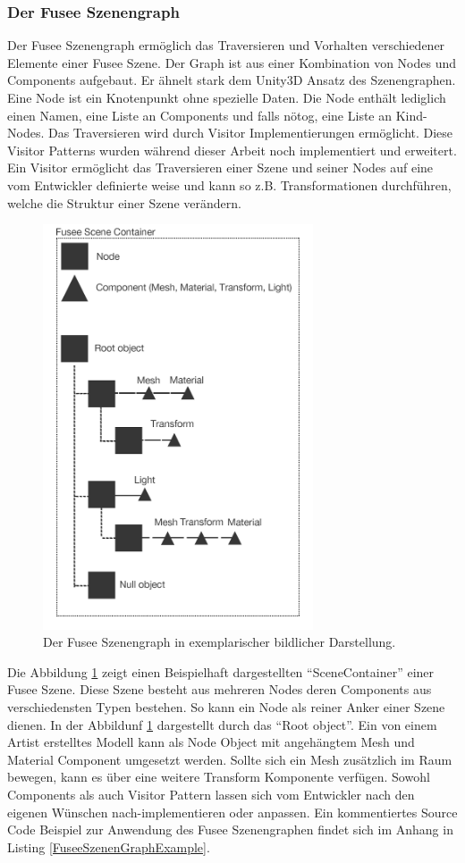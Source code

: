 \documentclass[pagesize, paper=a4, fontsize=12pt, titlepage=true, headings=small, headnosepline, abstractoff, liststotoc, nochapterprefix, plainheadsepline, twoside]{scrreprt}
\begin{document}
\subsubsection{Der Fusee Szenengraph}
Der Fusee Szenengraph ermöglich das Traversieren und Vorhalten verschiedener Elemente einer Fusee Szene. Der Graph ist aus einer Kombination von Nodes und Components aufgebaut. Er ähnelt stark dem Unity3D Ansatz des Szenengraphen. Eine Node ist ein Knotenpunkt ohne spezielle Daten. Die Node enthält lediglich einen Namen, eine Liste an Components und falls nötog, eine Liste an Kind-Nodes. Das Traversieren wird durch Visitor Implementierungen ermöglicht. Diese Visitor Patterns wurden während dieser Arbeit noch implementiert und erweitert. Ein Visitor ermöglicht das Traversieren einer Szene und seiner Nodes auf eine vom Entwickler definierte weise und kann so z.B. Transformationen durchführen, welche die Struktur einer Szene verändern.

\begin{figure}[ht]
	\centering
	\includegraphics[width=8cm]{Bilder/Fusee_Szenengraph_Vgl.jpg}
	\caption{Der Fusee Szenengraph in exemplarischer bildlicher Darstellung.}
	\label{FuseeSzenenGraph}
\end{figure}

Die Abbildung \ref{FuseeSzenenGraph} zeigt einen Beispielhaft dargestellten “SceneContainer” einer Fusee Szene. Diese Szene besteht aus mehreren Nodes deren Components aus verschiedensten Typen bestehen. So kann ein Node als reiner Anker einer Szene dienen. In der Abbildunf \ref{FuseeSzenenGraph} dargestellt durch das “Root object”. Ein von einem Artist erstelltes Modell kann als Node Object mit angehängtem Mesh und Material Component umgesetzt werden. Sollte sich ein Mesh zusätzlich im Raum bewegen, kann es über eine weitere Transform Komponente verfügen. Sowohl Components als auch Visitor Pattern lassen sich vom Entwickler nach den eigenen Wünschen nach-implementieren oder anpassen. Ein kommentiertes Source Code Beispiel zur Anwendung des Fusee Szenengraphen findet sich im Anhang in Listing \ref{FuseeSzenenGraphExample}.
\end{document}
